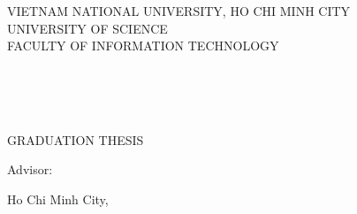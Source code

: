 \begin{titlepage}
\begin{center}

{\large VIETNAM NATIONAL UNIVERSITY, HO CHI MINH CITY}\\
{\large UNIVERSITY OF SCIENCE}\\
{\large FACULTY OF INFORMATION TECHNOLOGY}\\[0.3cm]

\HRule \\[0.4cm]


\vspace{1.5cm}

\tenSV \\
\mssv \\[1.2cm]

{\Huge \bfseries \tenKL \par}

\vspace{1.2cm}

{\large GRADUATION THESIS}\\
{\large \tenBM}

\vspace{1.5cm}

{\large Advisor: \tenGVHD}

\vfill

{\large Ho Chi Minh City, \the\year}

\end{center}
\end{titlepage}
